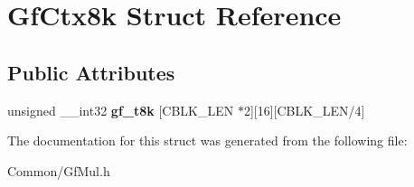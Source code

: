 \hypertarget{struct_gf_ctx8k}{}\section{Gf\+Ctx8k Struct Reference}
\label{struct_gf_ctx8k}
\subsection*{Public Attributes}
\begin{DoxyCompactItemize}
\item 
\mbox{\label{struct_gf_ctx8k_a48d26393ebfc1e2a0c71c008dda116ad}} 
unsigned \+\_\+\+\_\+int32 {\bfseries gf\+\_\+t8k} \mbox{[}C\+B\+L\+K\+\_\+\+L\+EN $\ast$2\mbox{]}\mbox{[}16\mbox{]}\mbox{[}C\+B\+L\+K\+\_\+\+L\+EN/4\mbox{]}
\end{DoxyCompactItemize}


The documentation for this struct was generated from the following file\+:\begin{DoxyCompactItemize}
\item 
Common/Gf\+Mul.\+h\end{DoxyCompactItemize}
